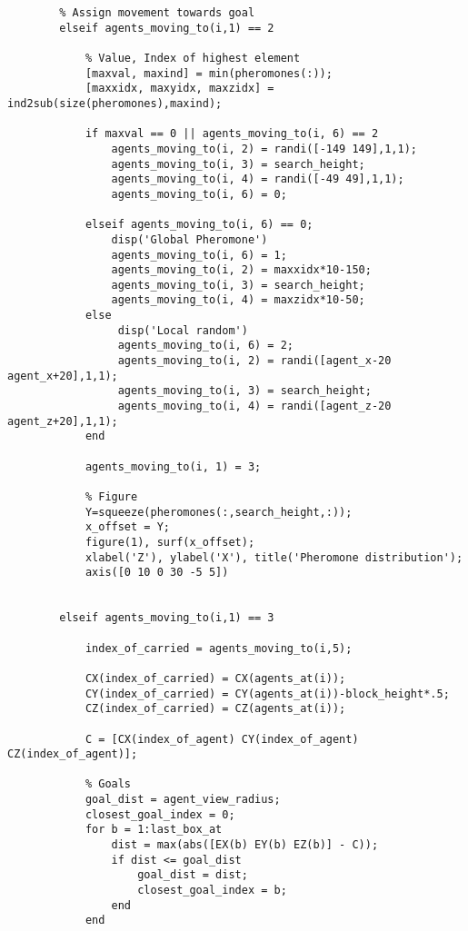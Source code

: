 \begin{lstlisting}
        % Assign movement towards goal
        elseif agents_moving_to(i,1) == 2
            
            % Value, Index of highest element
            [maxval, maxind] = min(pheromones(:));
            [maxxidx, maxyidx, maxzidx] = ind2sub(size(pheromones),maxind);

            if maxval == 0 || agents_moving_to(i, 6) == 2
                agents_moving_to(i, 2) = randi([-149 149],1,1);
                agents_moving_to(i, 3) = search_height; 
                agents_moving_to(i, 4) = randi([-49 49],1,1);
                agents_moving_to(i, 6) = 0;
                
            elseif agents_moving_to(i, 6) == 0;
                disp('Global Pheromone')
                agents_moving_to(i, 6) = 1;
                agents_moving_to(i, 2) = maxxidx*10-150;
                agents_moving_to(i, 3) = search_height; 
                agents_moving_to(i, 4) = maxzidx*10-50;
            else 
                 disp('Local random')
                 agents_moving_to(i, 6) = 2;
                 agents_moving_to(i, 2) = randi([agent_x-20 agent_x+20],1,1);
                 agents_moving_to(i, 3) = search_height; 
                 agents_moving_to(i, 4) = randi([agent_z-20 agent_z+20],1,1);
            end
            
            agents_moving_to(i, 1) = 3;
            
            % Figure
            Y=squeeze(pheromones(:,search_height,:));
            x_offset = Y;
            figure(1), surf(x_offset);
            xlabel('Z'), ylabel('X'), title('Pheromone distribution');
            axis([0 10 0 30 -5 5])

            
        elseif agents_moving_to(i,1) == 3
            
            index_of_carried = agents_moving_to(i,5);
            
            CX(index_of_carried) = CX(agents_at(i));
            CY(index_of_carried) = CY(agents_at(i))-block_height*.5;
            CZ(index_of_carried) = CZ(agents_at(i));
            
            C = [CX(index_of_agent) CY(index_of_agent) CZ(index_of_agent)];
            
            % Goals
            goal_dist = agent_view_radius;
            closest_goal_index = 0;
            for b = 1:last_box_at 
                dist = max(abs([EX(b) EY(b) EZ(b)] - C));
                if dist <= goal_dist
                    goal_dist = dist;
                    closest_goal_index = b;
                end
            end
            

\end{lstlisting}
